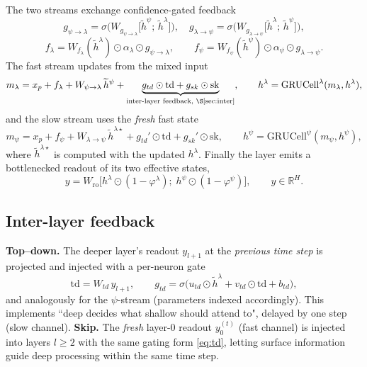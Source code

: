 \documentclass[11pt]{article}
\begin{document}
The two streams exchange confidence-gated feedback
\begin{equation}\label{eq:gates}
g_{\psi\to\lambda} = \sigma\Big(W_{g_{\psi\to\lambda}}
\big[\widetilde h^{\psi};\, \widetilde h^{\lambda}\big]\Big), \quad
g_{\lambda\to\psi} = \sigma\Big(W_{g_{\lambda\to\psi}}
\big[\widetilde h^{\lambda};\, \widetilde h^{\psi}\big]\Big),
\end{equation}
\begin{equation}\label{eq:fb}
f_{\lambda} = W_{f_\lambda}(\widetilde h^{\lambda}) \odot \alpha_\lambda \odot
g_{\psi\to\lambda}, \qquad
f_{\psi} = W_{f_\psi}(\widetilde h^{\psi}) \odot \alpha_\psi \odot
g_{\lambda\to\psi}.
\end{equation}
The fast stream updates from the mixed input
\begin{equation}\label{eq:mixlam}
m_{\lambda} = x_p + f_{\lambda} + W_{\psi\to\lambda}\,\widetilde h^{\psi}
+ \underbrace{g_{td}\odot \mathrm{td} + g_{sk}\odot \mathrm{sk}}_{\text{inter-layer feedback, \S\ref{sec:inter}}},
\qquad h^{\lambda} = \mathrm{GRUCell}^{\lambda}(m_{\lambda}, h^{\lambda}),
\end{equation}
and the slow stream uses the \emph{fresh} fast state
\begin{equation}\label{eq:mixpsi}
m_{\psi} = x_p + f_{\psi} + W_{\lambda\to\psi}\,\widetilde h^{\lambda\star}
+ g_{td}' \odot \mathrm{td} + g_{sk}' \odot \mathrm{sk}, \qquad
h^{\psi} = \mathrm{GRUCell}^{\psi}(m_{\psi}, h^{\psi}),
\end{equation}
where $\widetilde h^{\lambda\star}$ is computed with the updated
$h^{\lambda}$. Finally the layer emits a bottlenecked readout of its two
effective states,
\begin{equation}\label{eq:readout}
y = W_{\mathrm{ro}} \big[ h^{\lambda}\odot(1-\varphi^{\lambda});\;
h^{\psi}\odot(1-\varphi^{\psi}) \big], \qquad y \in \mathbb{R}^{H}.
\end{equation}

\subsection{Inter-layer feedback}\label{sec:inter}
\textbf{Top--down.} The deeper layer's readout $y_{l+1}$ at the \emph{previous
time step} is projected and injected with a per-neuron gate
\begin{equation}\label{eq:td}
\mathrm{td} = W_{td}\, y_{l+1}, \qquad
g_{td} = \sigma\big(u_{td} \odot \widetilde h^{\lambda}
+ v_{td} \odot \mathrm{td} + b_{td}\big),
\end{equation}
and analogously for the $\psi$-stream (parameters indexed accordingly).
This implements ``deep decides what shallow should attend to", delayed by one
step (slow channel).
\textbf{Skip.} The \emph{fresh} layer-0 readout $y_0^{(t)}$ (fast channel)
is injected into layers $l \ge 2$ with the same gating form
\eqref{eq:td}, letting surface information guide deep processing within the
same time step.
\end{document}
